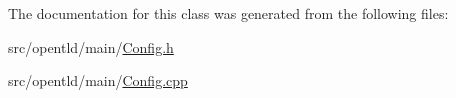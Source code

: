 The documentation for this class was generated from the following files:\begin{DoxyCompactItemize}
\item 
src/opentld/main/\hyperlink{_config_8h}{Config.h}\item 
src/opentld/main/\hyperlink{_config_8cpp}{Config.cpp}\end{DoxyCompactItemize}
